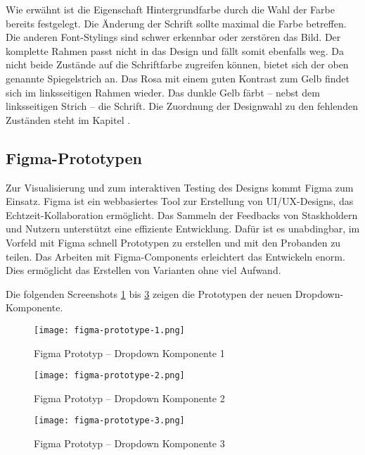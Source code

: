 Wie erwähnt ist die Eigenschaft Hintergrundfarbe durch die Wahl der Farbe bereits festgelegt. 
Die Änderung der Schrift sollte maximal die Farbe betreffen. 
Die anderen Font-Stylings sind schwer erkennbar oder zerstören das Bild. 
Der komplette Rahmen passt nicht in das Design und fällt somit ebenfalls weg. 
Da nicht beide Zustände auf die Schriftfarbe zugreifen können, bietet sich der oben genannte Spiegelstrich an. 
Das Rosa mit einem guten Kontrast zum Gelb findet sich im linksseitigen Rahmen wieder. 
Das dunkle Gelb färbt – nebst dem linksseitigen Strich – die Schrift. 
Die Zuordnung der Designwahl zu den fehlenden Zuständen steht im Kapitel \textbf{}. 


\clearpage
\subsection{Figma-Prototypen}
\label{sec:figmaPrototype}

Zur Visualisierung und zum interaktiven Testing des Designs kommt Figma zum Einsatz. 
Figma ist ein webbasiertes Tool zur Erstellung von UI/UX-Designs, das Echtzeit-Kollaboration ermöglicht. 
Das Sammeln der Feedbacks von Staskholdern und Nutzern unterstützt eine effiziente Entwicklung. 
Dafür ist es unabdingbar, im Vorfeld mit Figma schnell Prototypen zu erstellen und mit den Probanden zu teilen. 
Das Arbeiten mit Figma-Components erleichtert das Entwickeln enorm. 
Dies ermöglicht das Erstellen von Varianten ohne viel Aufwand. 

Die folgenden Screenshots \ref{img:figmaPrototype1} bis \ref{img:figmaPrototype3} zeigen die Prototypen der neuen Drop\-down-Kom\-po\-nente. 

\begin{figure}[!htb]
    \centering
    \texttt{[image: figma-prototype-1.png]}
    \caption{\centering Figma Prototyp – Dropdown Komponente 1}
    \label{img:figmaPrototype1}
\end{figure}

\begin{figure}[!htb]
    \centering
    \texttt{[image: figma-prototype-2.png]}
    \caption{\centering Figma Prototyp – Dropdown Komponente 2}
    \label{img:figmaPrototype2}
\end{figure}

\begin{figure}[!htb]
    \centering
    \texttt{[image: figma-prototype-3.png]}
    \caption{\centering Figma Prototyp – Dropdown Komponente 3}
    \label{img:figmaPrototype3}
\end{figure}


